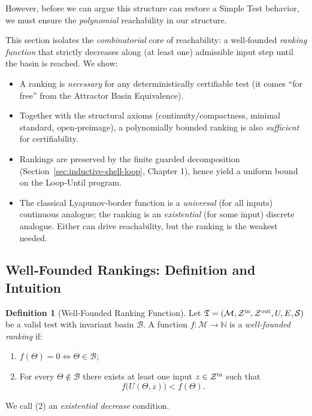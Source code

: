 \documentclass[12pt]{article}
\theoremstyle{definition}
\newtheorem{definition}{Definition}[section]
\theoremstyle{plain}
\begin{document}
However, before we can argue this structure can restore a Simple Test behavior, we must ensure the \emph{polynomial} reachability in our structure.

This section isolates the \emph{combinatorial} core of reachability: a well‑founded \emph{ranking function} that strictly decreases along (at least one) admissible input step until the basin is reached.  We show:

\begin{itemize}
  \item A ranking is \emph{necessary} for any deterministically certifiable test (it comes “for free” from the Attractor Basin Equivalence).
  \item Together with the structural axioms (continuity/compactness, minimal standard, open‑preimage), a polynomially bounded ranking is also \emph{sufficient} for certifiability.
  \item Rankings are preserved by the finite guarded decomposition (Section~\ref{sec:inductive-shell-loop}, Chapter 1), hence yield a uniform bound on the Loop‑Until program.
  \item The classical Lyapunov‑border function is a \emph{universal} (for all inputs) continuous analogue; the ranking is an \emph{existential} (for some input) discrete analogue.  Either can drive reachability, but the ranking is the weakest needed.
\end{itemize}

\subsection{Well‑Founded Rankings: Definition and Intuition}
\label{subsec:ranking-def}

\begin{definition}[Well‑Founded Ranking Function]
\label{def:ranking}
Let $\mathfrak T=(\mathcal M,\mathcal Z^{\rm in},\mathcal Z^{\rm out},U,E,\mathcal S)$ be a valid test with invariant basin $\mathcal B$.  
A function $f:\mathcal M\to\mathbb N$ is a \emph{well‑founded ranking} if:
\begin{enumerate}
  \item $f(\Theta)=0 \iff \Theta\in\mathcal B$;
  \item For every $\Theta\notin\mathcal B$ there exists at least one input $z\in\mathcal Z^{\rm in}$ such that
  \[
     f\bigl(U(\Theta,z)\bigr) < f(\Theta).
  \]
\end{enumerate}
We call (2) an \emph{existential decrease} condition.
\end{definition}
\end{document}
